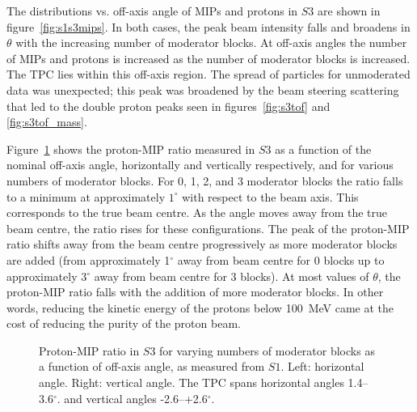 The distributions vs. off-axis angle of MIPs and protons in $\mathit{S3}$ are shown in figure~\ref{fig:s1s3mips}.
In both cases, the peak beam intensity falls and broadens in $\theta$ with the increasing number of moderator blocks. 
At off-axis angles the number of MIPs and protons is increased as the number of moderator blocks is increased.
The TPC lies within this off-axis region.
The spread of particles for unmoderated data was unexpected; this peak was broadened by the beam steering scattering that led to the double proton peaks seen in figures~\ref{fig:s3tof} and \ref{fig:s3tof_mass}.


Figure~\ref{fig:propiratio_s3_horz} shows the proton-MIP ratio measured in $\mathit{S3}$ as a function of the nominal off-axis angle, horizontally and vertically respectively, and for various numbers of moderator blocks.
For 0, 1, 2, and 3 moderator blocks the ratio falls to a minimum at approximately $1^{\circ}$ with respect to the beam axis.
This corresponds to the true beam centre.
As the angle moves away from the true beam centre, the ratio rises for these configurations.
The peak of the proton-MIP ratio shifts away from the beam centre progressively as more moderator blocks are added (from approximately 1$^{\circ}$ away from beam centre for 0 blocks up to approximately 3$^{\circ}$ away from beam centre for 3 blocks).
At most values of $\theta$, the proton-MIP ratio falls with the addition of more moderator blocks. 
In other words, reducing the kinetic energy of the protons below 100~MeV came at the cost of reducing the purity of the proton beam.

\begin{figure}[!ht]
  \begin{minipage}[t]{0.48\textwidth}
    \begin{adjustbox}{max totalsize={\textwidth}{.35\textheight}, center}
      
    \end{adjustbox}
    
  \end{minipage}
  \hspace{0.3cm}
  \begin{minipage}[t]{0.48\textwidth}
    \begin{adjustbox}{max totalsize={\textwidth}{.35\textheight}, center}
      
    \end{adjustbox}
  \end{minipage}	
  \caption{\label{fig:propiratio_s3_horz}Proton-MIP ratio in $\mathit{S3}$ for varying numbers of moderator blocks as a function of off-axis angle, as measured from $\mathit{S1}$.  Left: horizontal angle. Right: vertical angle. The TPC spans horizontal angles 1.4--3.6$^{ \circ }$. and vertical angles -2.6--+2.6$^{ \circ }$.}
\end{figure}

